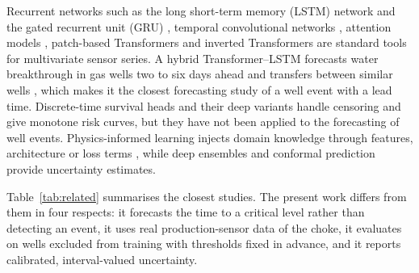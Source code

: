 Recurrent networks such as the long short-term memory (LSTM) network \citep{hochreiter1997} and the gated
recurrent unit (GRU) \citep{cho2014}, temporal convolutional networks \citep{bai2018}, attention models
\citep{vaswani2017}, patch-based Transformers \citep{nie2023} and inverted Transformers \citep{liu2024itrans}
are standard tools for multivariate sensor series. A hybrid Transformer--LSTM forecasts water breakthrough in
gas wells two to six days ahead and transfers between similar wells \citep{lai2026}, which makes it the
closest forecasting study of a well event with a lead time. Discrete-time survival heads
\citep{gensheimer2019,kvamme2021} and their deep variants \citep{lee2018deephit} handle censoring and give
monotone risk curves, but they have not been applied to the forecasting of well events. Physics-informed
learning injects domain knowledge through features, architecture or loss terms
\citep{karniadakis2021,willard2022}, while deep ensembles \citep{lakshminarayanan2017} and conformal
prediction \citep{angelopoulos2023} provide uncertainty estimates.

Table~\ref{tab:related} summarises the closest studies. The present work differs from them in four
respects: it forecasts the time to a critical level rather than detecting an event, it uses real
production-sensor data of the choke, it evaluates on wells excluded from training with thresholds fixed in
advance, and it reports calibrated, interval-valued uncertainty.

